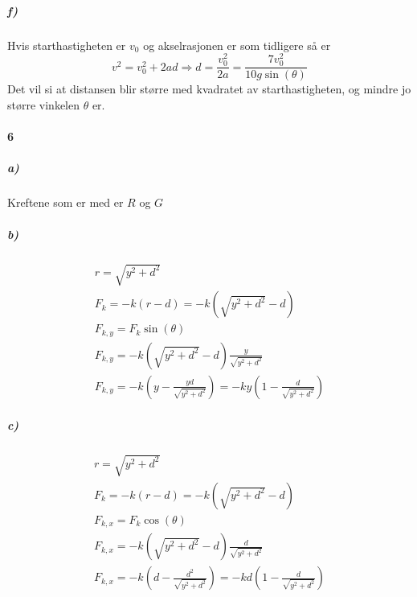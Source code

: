 \documentclass[11pt, A4paper,norsk]{article}
\begin{document}
			\subparagraph{f)}
				\begin{flushleft}
Hvis starthastigheten er $v_0$ og akselrasjonen er som tidligere så er
$$v^2 = v_0^2 + 2 a d \Rightarrow d = \frac{v_0^2}{2 a} = \frac{7 v_0^2}{10 g \sin(\theta)}$$
Det vil si at distansen blir større med kvadratet av starthastigheten, og mindre jo større vinkelen $\theta$ er.
				\end{flushleft}








		\paragraph{6}
			\subparagraph{a)}
				\begin{flushleft}
Kreftene som er med er $R$ og $G$
				\end{flushleft}









			\subparagraph{b)}
				\begin{gather*}
r = \sqrt{y^2 + d^2} \\
F_{k} = - k (r - d) = - k (\sqrt{y^2 + d^2} - d) \\
F_{k,y} = F_k \sin(\theta) \\
F_{k,y} = - k (\sqrt{y^2 + d^2} - d) \frac{y}{\sqrt{y^2 + d^2}} \\
F_{k,y} = - k \left( y - \frac{yd}{\sqrt{y^2 + d^2}} \right) = - ky \left( 1 - \frac{d}{\sqrt{y^2 + d^2}} \right)
				\end{gather*}









			\subparagraph{c)}
				\begin{gather*}
r = \sqrt{y^2 + d^2} \\
F_{k} = - k (r - d) = - k (\sqrt{y^2 + d^2} - d) \\
F_{k,x} = F_k \cos(\theta) \\
F_{k,x} = - k (\sqrt{y^2 + d^2} - d) \frac{d}{\sqrt{y^2 + d^2}} \\
F_{k,x} = - k \left( d - \frac{d^2}{\sqrt{y^2 + d^2}} \right) = - kd \left( 1 - \frac{d}{\sqrt{y^2 + d^2}} \right)
				\end{gather*}
\end{document}
